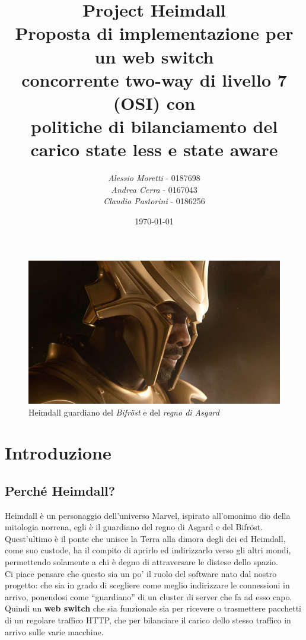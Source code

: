 \documentclass[italian]{tktltiki2}
\title{%
    \huge Project Heimdall 
    \\
    \large Proposta di implementazione per un web switch 
    \\
    concorrente two-way di livello 7 (OSI) con
    \\
    politiche di bilanciamento del carico state less e state aware
  }
\author{\emph{Alessio Moretti} - 0187698
    \\
    \emph{Andrea Cerra} - 0167043
    \\
    \emph{Claudio Pastorini} - 0186256}
\date{\today}
\begin{document}
\maketitle        %

\tableofcontents  %

\mainmatter       %

\thispagestyle{empty} 
\begin{figure}[H]
\centering
\includegraphics[width=\textwidth]{images/heimdall}
\caption{Heimdall guardiano del \emph{Bifröst} e del \emph{regno di Asgard}}
\end{figure}

\mainmatter       %
\newpage
\section{Introduzione}
\subsection{Perché Heimdall?}
Heimdall è un personaggio dell'universo Marvel, ispirato all'omonimo dio della mitologia norrena, egli è il guardiano del regno di Asgard e del Bifröst. Quest'ultimo è il ponte che unisce la Terra alla dimora degli dei ed Heimdall, come suo custode, ha il compito di aprirlo ed indirizzarlo verso gli altri mondi, permettendo solamente a chi è degno di attraversare le distese dello spazio.
\\
Ci piace pensare che questo sia un po' il ruolo del software nato dal nostro progetto: che sia in grado di scegliere come meglio indirizzare le connessioni in arrivo, ponendosi come ``guardiano'' di un cluster di server che fa ad esso capo. Quindi un \textbf{web switch} che sia funzionale sia per ricevere o trasmettere pacchetti di un regolare traffico HTTP, che per bilanciare il carico dello stesso traffico in arrivo sulle varie macchine.
\end{document}
